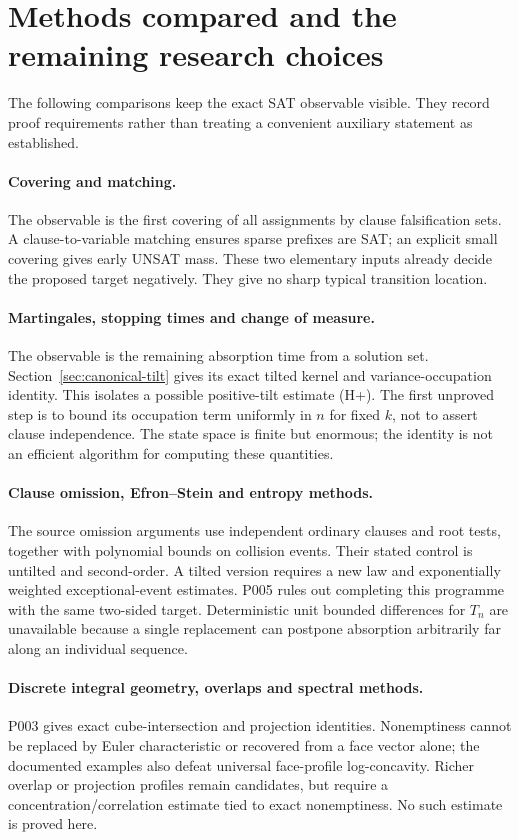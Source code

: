 \documentclass[11pt,a4paper]{article}
\begin{document}
\section{Methods compared and the remaining research choices}
The following comparisons keep the exact SAT observable visible.
They record proof requirements rather than treating a convenient
auxiliary statement as established.

\paragraph{Covering and matching.}
The observable is the first covering of all assignments by clause
falsification sets. A clause-to-variable matching ensures sparse
prefixes are SAT; an explicit small covering gives early UNSAT mass.
These two elementary inputs already decide the proposed target
negatively. They give no sharp typical transition location.

\paragraph{Martingales, stopping times and change of measure.}
The observable is the remaining absorption time from a solution set.
Section~\ref{sec:canonical-tilt} gives its exact tilted kernel and
variance-occupation identity. This isolates a possible positive-tilt
estimate (H+). The first unproved step is to bound its occupation
term uniformly in $n$ for fixed $k$, not to assert clause independence.
The state space is finite but enormous; the identity is not an efficient
algorithm for computing these quantities.

\paragraph{Clause omission, Efron--Stein and entropy methods.}
The source omission arguments use independent ordinary clauses and
root tests, together with polynomial bounds on collision events.
Their stated control is untilted and second-order. A tilted version
requires a new law and exponentially weighted exceptional-event
estimates. P005 rules out completing this programme with the same
two-sided target. Deterministic unit bounded differences for $T_n$
are unavailable because a single replacement can postpone absorption
arbitrarily far along an individual sequence.

\paragraph{Discrete integral geometry, overlaps and spectral methods.}
P003 gives exact cube-intersection and projection identities.
Nonemptiness cannot be replaced by Euler characteristic or recovered
from a face vector alone; the documented examples also defeat
universal face-profile log-concavity. Richer overlap or projection
profiles remain candidates, but require a concentration/correlation
estimate tied to exact nonemptiness. No such estimate is proved here.
\end{document}

